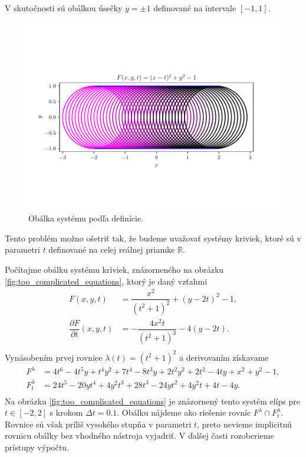 V skutočnosti sú obálkou úsečky $y=\pm 1$ definované na intervale $[-1,1]$.

\begin{figure}[h]
	\centering
	\includegraphics[trim={0 1.65cm 0 2cm},clip]{images/system_with_correct_envelope.pdf}
	\caption{Obálka systému podľa definície.}
	\label{fig:system_with_correct_envelope}
\end{figure}

Tento problém možno ošetriť tak, že budeme uvažovať systémy kriviek, ktoré sú v parametri $t$ definované na celej reálnej priamke $\mathbb{R}$. 

\begin{example}
\label{example:too_complicated_equations}
Počítajme obálku systému kriviek, znázorneného na obrázku \ref{fig:too_complicated_equations}, ktorý je daný vzťahmi
\begin{align*}
F(x,y, t) &= \dfrac{x^2}{(t^2 + 1)^2} + (y - 2t)^2 - 1, \\
\dfrac{\partial F}{\partial t}(x, y, t) &= -\dfrac{4x^2t}{\left(t^2+1\right)^3}-4\left(y-2t\right). \\
\end{align*}
Vynásobením prvej rovnice $ \lambda(t) = (t^2 + 1)^2$ a derivovaním získavame
\begin{align*}
F^\lambda &= 4 t^6 - 4 t^5 y + t^4 y^2 + 7 t^4 - 8 t^3 y + 2 t^2 y^2 + 2 t^2 - 4 t y + x^2 + y^2 - 1, \\
F_t^\lambda &= 24t^5-20yt^4+4y^2t^3+28t^3-24yt^2+4y^2t+4t-4y. \\
\end{align*}
Na obrázku \ref{fig:too_complicated_equations} je znázornený tento systém elíps pre $t \in [-2,2]$ s krokom $\Delta t=0.1$. Obálku nájdeme ako riešenie rovníc $F^\lambda \cap F_t^\lambda. $ Rovnice sú však príliš vysokého stupňa v parametri $t$, preto nevieme implicitnú rovnicu obálky bez vhodného nástroja vyjadriť. V ďalšej časti rozoberieme prístupy výpočtu.
\end{example}

